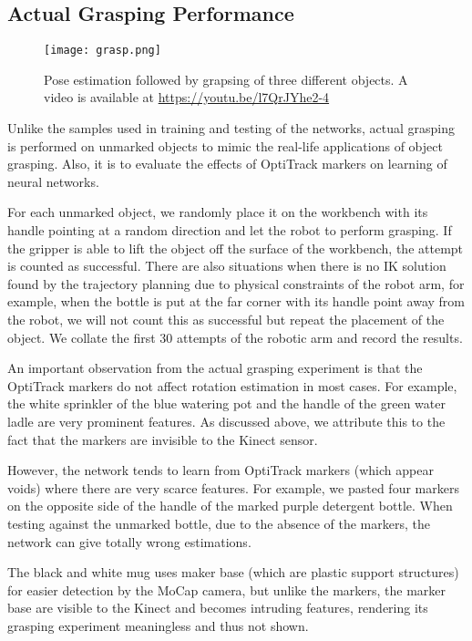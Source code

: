 \documentclass[conference]{IEEEtran}
\begin{document}
\subsection{Actual Grasping Performance}
\begin{figure}[htbp]
 \centerline{\texttt{[image: grasp.png]}}
 \caption{Pose estimation followed by grapsing of three different objects. A video is available at \url{https://youtu.be/l7QrJYhe2-4}}
 \label{fig_grasp}
\end{figure}
Unlike the samples used in training and testing of the networks, actual grasping is performed on unmarked objects to mimic the real-life applications of object grasping. Also, it is to evaluate the effects of OptiTrack markers on learning of neural networks.

For each unmarked object, we randomly place it on the workbench with its handle pointing at a random direction and let the robot to perform grasping. If the gripper is able to lift the object off the surface of the workbench, the attempt is counted as successful. There are also situations when there is no IK solution found by the trajectory planning due to physical constraints of the robot arm, for example, when the bottle is put at the far corner with its handle point away from the robot, we will not count this as successful but repeat the placement of the object. We collate the first 30 attempts of the robotic arm and record the results.

An important observation from the actual grasping experiment is that the  OptiTrack markers do not affect rotation estimation in most cases. For example, the white sprinkler of the blue watering pot and the handle of the green water ladle are very prominent features. As discussed above, we attribute this to the fact that the markers are invisible to the Kinect sensor.

However, the network tends to learn from OptiTrack markers (which appear voids) where there are very scarce features. For example, we pasted four markers on the opposite side of the handle of the marked purple detergent bottle. When testing against the unmarked bottle, due to the absence of the markers, the network can give totally wrong estimations.

The black and white mug uses maker base (which are plastic support structures) for easier detection by the MoCap camera, but unlike the markers, the marker base are visible to the Kinect and becomes intruding features, rendering its grasping experiment meaningless and thus not shown.
\end{document}
